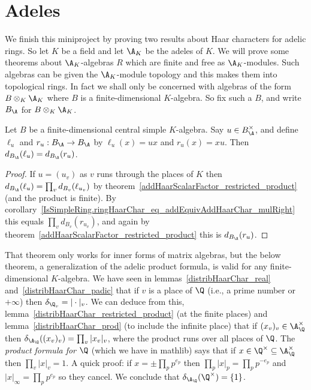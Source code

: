 \section{Adeles}

We finish this miniproject by proving two results about Haar characters for
adelic rings. So let $K$ be a field and let $\A_K$ be the adeles of $K$.
We will prove some theorems about $\A_K$-algebras $R$ which are finite
and free as $\A_K$-modules. Such algebras can be given the $\A_K$-module topology
and this makes them into topological rings. In fact we shall only be concerned
with algebras of the form $B\otimes_K\A_K$ where $B$ is a finite-dimensional
$K$-algebra. So fix such a $B$, and write $B_{\A}$ for $B\otimes_K\A_K$.

\begin{theorem}
  \label{addHaarScalarFactor.left_mul_eq_right_mul}
  Let $B$ be a finite-dimensional central simple $K$-algebra.
  Say $u\in B_{\A}^\times$, and define $\ell_u$ and $r_u:B_{\A}\to B_{\A}$ by
  $\ell_u(x)=ux$ and $r_u(x)=xu$. Then $d_{B_{\A}}(\ell_u)=d_{B_{\A}}(r_u)$.
\end{theorem}
\begin{proof} If $u=(u_v)$ as $v$ runs through the places of $K$ then
  $d_{B_{\A}}(\ell_u)=\prod_v d_{B_v}(\ell_{u_v})$ by
  theorem~\ref{addHaarScalarFactor_restricted_product} (and the product is finite).
  By corollary~\ref{IsSimpleRing.ringHaarChar_eq_addEquivAddHaarChar_mulRight}
  this equals $\prod_v d_{B_v}(r_{u_v})$, and again by
  theorem~\ref{addHaarScalarFactor_restricted_product} this is $d_{B_{\A}}(r_u)$.
\end{proof}

That theorem only works for inner forms of matrix algebras, but the below theorem,
a generalization of the adelic product formula, is valid for any finite-dimensional
$K$-algebra.
We have seen in lemmas~\ref{distribHaarChar_real} and~\ref{distribHaarChar_padic}
  that if $v$ is a place of $\Q$ (i.e., a prime
  number or $+\infty$) then $\delta_{\Q_v}=|\cdot|_v$.
  We can deduce from this, lemma~\ref{distribHaarChar_restricted_product} (at the finite places)
  and lemma~\ref{distribHaarChar_prod} (to include the infinite place) that if $(x_v)_v\in\A_{\Q}^\times$
  then $\delta_{\A_{\Q}}((x_v)_v)=\prod_v|x_v|_v$, where the product
  runs over all places of $\Q$.
  The \emph{product formula for $\Q$} (which we have in mathlib) says
  that if $x\in\Q^\times\subseteq\A_{\Q}^\times$ then $\prod_v|x|_v=1.$
  A quick proof: if $x=\pm\prod_pp^{e_p}$ then $\prod_p|x|_p=\prod_pp^{-e_p}$
  and $|x|_\infty=\prod_pp^{e_p}$ so they cancel. We conclude that $\delta_{\A_{\Q}}(\Q^\times)=\{1\}$.

